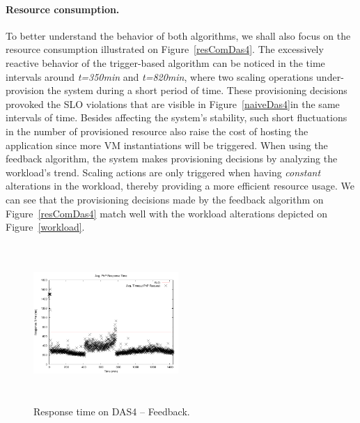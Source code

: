 \paragraph{Resource consumption.}

To better understand the behavior of both algorithms, we shall also focus on the resource consumption illustrated on Figure~\ref{resComDas4}. The excessively reactive behavior of the trigger-based algorithm can be noticed in the time intervals around \emph{t=350min} and \emph{t=820min}, where two scaling operations under-provision the system during a short period of time. These provisioning decisions provoked the SLO violations that are visible in Figure~\ref{naiveDas4}in the same intervals of time. Besides affecting the system's stability, such short fluctuations in the number of provisioned resource also raise the cost of hosting the application since more VM instantiations will be triggered. When using the feedback algorithm, the system makes provisioning decisions by analyzing the workload's trend. Scaling actions are only triggered when having \emph{constant} alterations in the workload, thereby providing a more efficient resource usage. We can see that the provisioning decisions made by the feedback algorithm on Figure~\ref{resComDas4} match well with the workload alterations depicted on Figure~\ref{workload}.

\begin{figure}
\begin{center}
\includegraphics[width=0.49\textwidth, height=6cm]{./images/homogeneous/avgTimeout_PhP_feedback}
\end{center}
\vspace{-5mm}
\caption{Response time on DAS4 -- Feedback.}
\label{historyDas4}
\end{figure}

